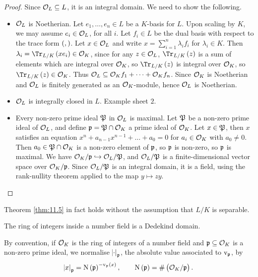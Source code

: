 \begin{proof}
Since $ \mathcal{O}_L \subseteq L $, it is an integral domain. We need to show the following.
\begin{itemize}
\item $ \mathcal{O}_L $ is Noetherian. Let $ e_1, \dots, e_n \in L $ be a $ K $-basis for $ L $. Upon scaling by $ K $, we may assume $ e_i \in \mathcal{O}_L $, for all $ i $. Let $ f_i \in L $ be the dual basis with respect to the trace form $ \br{,} $. Let $ x \in \mathcal{O}_L $ and write $ x = \sum_{i = 1}^n \lambda_if_i $ for $ \lambda_i \in K $. Then $ \lambda_i = \Tr_{L / K}\br{xe_i} \in \OOO_K $, since for any $ z \in \mathcal{O}_L $, $ \Tr_{L / K}\br{z} $ is a sum of elements which are integral over $ \mathcal{O}_K $, so $ \Tr_{L / K}\br{z} $ is integral over $ \mathcal{O}_K $, so $ \Tr_{L / K}\br{z} \in \OOO_K $. Thus $ \mathcal{O}_L \subseteq \mathcal{O}_Kf_1 + \dots + \mathcal{O}_Kf_n $. Since $ \mathcal{O}_K $ is Noetherian and $ \mathcal{O}_L $ is finitely generated as an $ \mathcal{O}_K $-module, hence $ \mathcal{O}_L $ is Noetherian.
\item $ \mathcal{O}_L $ is integrally closed in $ L $. Example sheet $ 2 $.
\item Every non-zero prime ideal $ \mathfrak{P} $ in $ \mathcal{O}_L $ is maximal. Let $ \mathfrak{P} $ be a non-zero prime ideal of $ \mathcal{O}_L $, and define $ \mathfrak{p} = \mathfrak{P} \cap \mathcal{O}_K $ a prime ideal of $ \mathcal{O}_K $. Let $ x \in \mathfrak{P} $, then $ x $ satisfies an equation $ x^n + a_{n - 1}x^{n - 1} + \dots + a_0 = 0 $ for $ a_i \in \mathcal{O}_K $ with $ a_0 \ne 0 $. Then $ a_0 \in \mathfrak{P} \cap \mathcal{O}_K $ is a non-zero element of $ \mathfrak{p} $, so $ \mathfrak{p} $ is non-zero, so $ \mathfrak{p} $ is maximal. We have $ \mathcal{O}_K / \mathfrak{p} \hookrightarrow \mathcal{O}_L / \mathfrak{P} $, and $ \mathcal{O}_L / \mathfrak{P} $ is a finite-dimensional vector space over $ \mathcal{O}_K / \mathfrak{p} $. Since $ \mathcal{O}_L / \mathfrak{P} $ is an integral domain, it is a field, using the rank-nullity theorem applied to the map $ y \mapsto zy $.
\end{itemize}
\end{proof}

\begin{remark*}
Theorem \ref{thm:11.5} in fact holds without the assumption that $ L / K $ is separable.
\end{remark*}

\begin{corollary}
The ring of integers inside a number field is a Dedekind domain.
\end{corollary}

By convention, if $ \mathcal{O}_K $ is the ring of integers of a number field and $ \mathfrak{p} \subseteq \mathcal{O}_K $ is a non-zero prime ideal, we normalise $ \abs{\cdot}_{\mathfrak{p}} $, the absolute value associated to $ \mathrm{v}_{\mathfrak{p}} $, by
$$ \abs{x}_\ppp = \N\br{\ppp}^{-\v_\ppp\br{x}}, \qquad \N\br{\ppp} = \#\br{\OOO_K / \ppp}. $$

